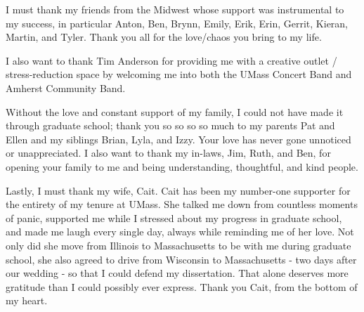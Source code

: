 I must thank my friends from the Midwest whose support was instrumental to my success, in particular Anton, Ben, Brynn, Emily, Erik, Erin, Gerrit, Kieran, Martin, and Tyler. Thank you all for the love/chaos you bring to my life.

I also want to thank Tim Anderson for providing me with a creative outlet / stress-reduction space by welcoming me into both the UMass Concert Band and Amherst Community Band. 

Without the love and constant support of my family, I could not have made it through graduate school; thank you so so so so much to my parents Pat and Ellen and my siblings Brian, Lyla, and Izzy. Your love has never gone unnoticed or unappreciated. I also want to thank my in-laws, Jim, Ruth, and Ben, for opening your family to me and being understanding, thoughtful, and kind people. 

Lastly, I must thank my wife, Cait. Cait has been my number-one supporter for the entirety of my tenure at UMass. She talked me down from countless moments of panic, supported me while I stressed about my progress in graduate school, and made me laugh every single day, always while reminding me of her love. Not only did she move from Illinois to Massachusetts to be with me during graduate school, she also agreed to drive from Wisconsin to Massachusetts - two days after our wedding - so that I could defend my dissertation. That alone deserves more gratitude than I could possibly ever express. Thank you Cait, from the bottom of my heart.

